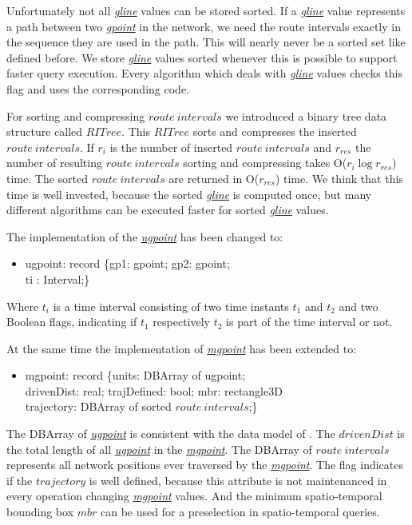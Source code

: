 \documentclass[a4paper]{article}
\newcommand{\dt}[1]{\textsl{\underline{#1}}}
\begin{document}
Unfortunately not all \dt{gline} values can be stored sorted. If a \dt{gline}
value represents a path between two \dt{gpoint} in the network, we need the
route intervals exactly in the sequence they are used in the path. This will
nearly never be a sorted set like defined before.  We store \dt{gline}
values sorted whenever this is possible to support faster query execution.
Every algorithm which deals with \dt{gline} values checks this flag and uses
the corresponding code.

For sorting and compressing $route\ intervals$ we introduced a binary tree
data structure called $RITree$. This $RITree$ sorts and compresses the inserted
$route\ intervals$. If $r_i$ is the number of inserted $route\ intervals$ and
$r_{res}$ the number of resulting $route\ intervals$ sorting and compressing takes
O($r_i \log r_{res}$) time. The sorted $route\ intervals$ are returned in
O($r_{res}$) time. We think that this time is well invested, because the sorted
\dt{gline} is computed once, but many different algorithms can be executed faster
for sorted \dt{gline} values.

The implementation of the \dt{ugpoint} has been changed to:
\begin{ttfamily}
\begin{itemize}
  \item [] ugpoint: record \{gp1: gpoint; gp2: gpoint;\\
ti : Interval;\}
\end{itemize}
\end{ttfamily}
Where $t_i$ is a time interval consisting of two time instants $t_1$ and $t_2$
and
two Boolean flags, indicating if $t_1$ respectively $t_2$ is part of the time
interval
or not.

At the same time the implementation of \dt{mgpoint} has been extended to:
\begin{ttfamily}
\begin{itemize}
  \item [] mgpoint: record \{units: DBArray of ugpoint;\\
drivenDist: real; trajDefined: bool; mbr: rectangle3D\\
trajectory: DBArray of sorted $route\ intervals$;\}
\end{itemize}
\end{ttfamily}
The DBArray of \dt{ugpoint} is consistent with the data model of
\cite{NetworkGueting}.
The $drivenDist$ is the total length of all \dt{ugpoint} in the \dt{mgpoint}.
The DBArray of $route\ intervals$ represents all network positions ever traversed
by the \dt{mgpoint}. The flag indicates if the $trajectory$ is well defined,
because this attribute is not maintenanced in every operation changing
\dt{mgpoint} values. And the minimum spatio-temporal bounding box $mbr$ can be
used for a preselection in spatio-temporal queries.
\end{document}

